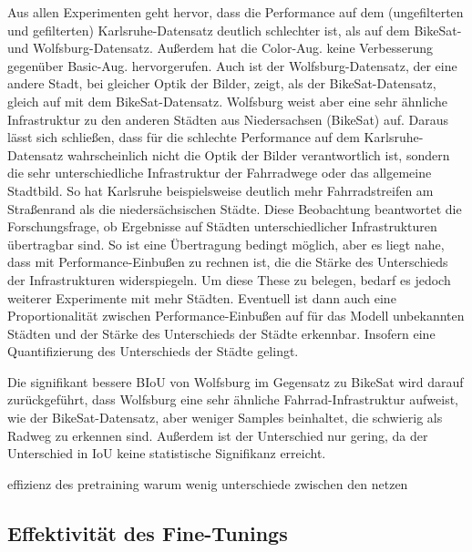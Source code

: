Aus allen Experimenten geht hervor, dass die Performance auf dem (ungefilterten und gefilterten) Karlsruhe-Datensatz deutlich schlechter ist, 
als auf dem BikeSat- und Wolfsburg-Datensatz. Außerdem hat die Color-Aug. keine Verbesserung gegenüber 
Basic-Aug. hervorgerufen. Auch ist der Wolfsburg-Datensatz, der eine andere Stadt, bei gleicher Optik der Bilder, 
zeigt, als der BikeSat-Datensatz, gleich auf mit dem BikeSat-Datensatz. Wolfsburg weist aber eine sehr ähnliche 
Infrastruktur zu den anderen Städten aus Niedersachsen (BikeSat) auf. Daraus lässt sich schließen, 
dass für die schlechte Performance auf dem Karlsruhe-Datensatz wahrscheinlich nicht die Optik der Bilder verantwortlich 
ist, sondern die sehr unterschiedliche Infrastruktur der Fahrradwege oder das allgemeine Stadtbild. 
So hat Karlsruhe beispielsweise deutlich mehr Fahrradstreifen am Straßenrand als die niedersächsischen Städte. 
Diese Beobachtung beantwortet die Forschungsfrage, ob Ergebnisse auf Städten unterschiedlicher Infrastrukturen 
übertragbar sind. So ist eine Übertragung bedingt möglich, aber es liegt nahe, dass mit Performance-Einbußen zu rechnen ist, 
die die Stärke des Unterschieds der Infrastrukturen widerspiegeln. 
Um diese These zu belegen, bedarf es jedoch weiterer Experimente mit mehr Städten. Eventuell ist dann 
auch eine Proportionalität zwischen Performance-Einbußen auf für das Modell unbekannten Städten und der Stärke 
des Unterschieds der Städte erkennbar. Insofern eine Quantifizierung des Unterschieds der Städte gelingt. 

Die signifikant bessere BIoU von Wolfsburg im Gegensatz zu BikeSat wird darauf zurückgeführt, dass 
Wolfsburg eine sehr ähnliche Fahrrad-Infrastruktur aufweist, wie der BikeSat-Datensatz, aber weniger 
Samples beinhaltet, die schwierig als Radweg zu erkennen sind. Außerdem ist der Unterschied nur gering, 
da der Unterschied in IoU keine statistische Signifikanz erreicht. 


effizienz des pretraining 
warum wenig unterschiede zwischen den netzen

\subsection{Effektivität des Fine-Tunings}



